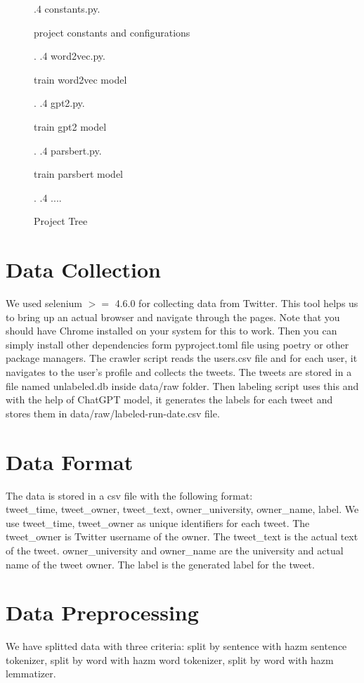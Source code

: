 \documentclass[12pt, letterpaper]{article}
\begin{document}
\begin{figure}[H]
{        .4 constants.py.\dotfill\begin{minipage}[t]{5cm}project constants and configurations\end{minipage}.
        .4 word2vec.py.\dotfill\begin{minipage}[t]{5cm}train word2vec model\end{minipage}.
        .4 gpt2.py.\dotfill\begin{minipage}[t]{5cm}train gpt2 model\end{minipage}.
        .4 parsbert.py.\dotfill\begin{minipage}[t]{5cm}train parsbert model\end{minipage}.
        .4 ....
    }
    \caption{Project Tree}
    \end{figure}

    \section{Data Collection}\label{sec:data-collection}
    We used selenium $>=$ 4.6.0 for collecting data from Twitter. This tool helps us to bring up an actual browser and navigate through the pages. Note that you should have Chrome installed on your system for this to work. Then you can simply install other dependencies form pyproject.toml file using poetry or other package managers.
    The crawler script reads the users.csv file and for each user, it navigates to the user's profile and collects the tweets. The tweets are stored in a file named unlabeled.db inside data\slash raw folder. Then labeling script uses this and with the help of ChatGPT model, it generates the labels for each tweet and stores them in data\slash raw\slash labeled-run-date.csv file.


    \section{Data Format}\label{sec:data-format}
    The data is stored in a csv file with the following format:\\ tweet\_time, tweet\_owner, tweet\_text, owner\_university, owner\_name, label.
    We use tweet\_time, tweet\_owner as unique identifiers for each tweet. The tweet\_owner is Twitter username of the owner. The tweet\_text is the actual text of the tweet. owner\_university and owner\_name are the university and actual name of the tweet owner. The label is the generated label for the tweet.


    \section{Data Preprocessing}\label{sec:data-preprocessing}
    We have splitted data with three criteria: split by sentence with hazm sentence tokenizer, split by word with hazm word tokenizer, split by word with hazm lemmatizer.
\end{document}
